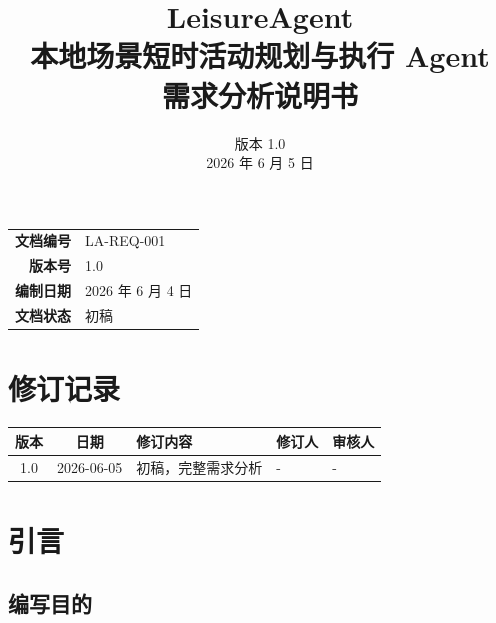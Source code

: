 \documentclass[12pt,a4paper]{ctexart}
\title{{\Huge\bfseries LeisureAgent}\\[6pt]
       {\Large 本地场景短时活动规划与执行 Agent}\\[12pt]
       {\LARGE\bfseries 需求分析说明书}}
\author{版本 1.0 \\[4pt] 2026 年 6 月 5 日}
\date{}
\begin{document}
\maketitle
\thispagestyle{empty}

\vspace{2cm}
\begin{center}
\begin{tabular}{rl}
\toprule
\textbf{文档编号} & LA-REQ-001 \\
\textbf{版本号}   & 1.0 \\
\textbf{编制日期} & 2026 年 6 月 4 日 \\
\textbf{文档状态} & 初稿 \\
\bottomrule
\end{tabular}
\end{center}

\newpage

\section*{修订记录}
\begin{table}[ht]
\centering
\begin{tabular}{cclll}
\toprule
\textbf{版本} & \textbf{日期} & \textbf{修订内容} & \textbf{修订人} & \textbf{审核人} \\
\midrule
1.0 & 2026-06-05 & 初稿，完整需求分析 & - & - \\
\bottomrule
\end{tabular}
\end{table}

\newpage

\tableofcontents
\newpage

\section{引言}

\subsection{编写目的}
\end{document}
